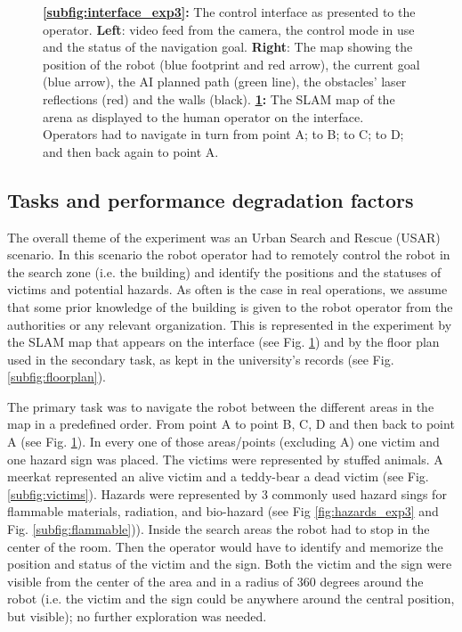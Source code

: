 \documentclass[a4paper,12pt,oneside,openright]{bhamthesis}
\begin{document}
\begin{figure}
\begin{subfigure}[b]{0.3\textwidth}
			\caption{}
			\label{subfig:map_exp3}
		\end{subfigure}
		\hfill
		\caption{ \textbf{\ref{subfig:interface_exp3}:} The control interface as presented to the operator. \textbf{Left}: video feed from the camera, the control mode in use and the status of the navigation goal. \textbf{Right}: The map showing the position of the robot (blue footprint and red arrow), the current goal (blue arrow), the AI planned path (green line), the obstacles' laser reflections (red) and the walls (black). \textbf{\ref{subfig:map_exp3}:} The SLAM map of the arena as displayed to the human operator on the interface. Operators had to navigate in turn from point A; to B; to C; to D; and then back again to point A.}
		\label{fig:map_floor_exp3}
	\end{figure}

\subsection{Tasks and performance degradation factors}
The overall theme of the experiment was an Urban Search and Rescue (USAR) scenario. In this scenario the robot operator had to remotely control the robot in the search zone (i.e. the building) and identify the positions and the statuses of victims and potential hazards. As often is the case in real operations, we assume that some prior knowledge of the building is given to the robot operator from the authorities or any relevant organization. This is represented in the experiment by the SLAM map that appears on the interface (see Fig. \ref{subfig:map_exp3}) and by the floor plan used in the secondary task, as kept in the university's records (see Fig. \ref{subfig:floorplan}). 

The primary task was to navigate the robot between the different areas in the map in a predefined order. From point A to point B, C, D and then back to point A (see Fig. \ref{subfig:map_exp3}). In every one of those areas/points (excluding A) one victim and one hazard sign was placed. The victims were represented by stuffed animals. A meerkat represented an alive victim and a teddy-bear a dead victim (see Fig. \ref{subfig:victims}). Hazards were represented by 3 commonly used hazard sings for flammable materials, radiation, and bio-hazard (see Fig \ref{fig:hazards_exp3} and Fig. \ref{subfig:flammable})). Inside the search areas the robot had to stop in the center of the room. Then the operator would have to identify and memorize the position and status of the victim and the sign. Both the victim and the sign were visible from the center of the area and in a radius of $360$ degrees around the robot (i.e. the victim and the sign could be anywhere around the central position, but visible); no further exploration was needed.
\end{document}
